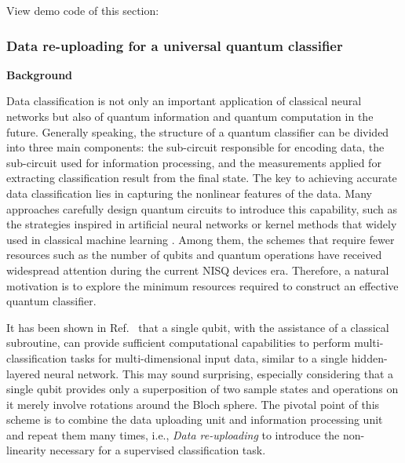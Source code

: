 View demo code of this section: 

\subsubsection{Data re-uploading for a universal quantum classifier}
\textbf{Background}


Data classification is not only an important application of classical neural networks but also of quantum information and quantum computation in the future. Generally speaking, the structure of a quantum classifier can be divided into three main components: the sub-circuit responsible for encoding data, the sub-circuit used for information processing, and the measurements applied for extracting classification result from the final state.
The key to achieving accurate data classification lies in capturing the nonlinear features of the data. Many approaches carefully design quantum circuits to introduce this capability, such as the strategies inspired in artificial neural networks or kernel methods that widely used in classical machine learning \cite{PhysRevLett.122.040504, 2019Supervised_nature, Wan_2017_npjqi, hur2022quantum, chalumuri2021hybrid, oh2020tutorial, farhi2018classification, wrobel2021application}. Among them, the schemes that require fewer resources such as the number of qubits and quantum operations have received widespread attention during the current NISQ devices era.
Therefore, a natural motivation is to explore the minimum resources required to construct an effective quantum classifier.

It has been shown in Ref.~\cite{PerezSalinas2020datareuploading} that a single qubit, with the assistance of a classical subroutine, can provide sufficient computational capabilities to perform multi-classification tasks for multi-dimensional input data, similar to a single hidden-layered neural network. This may sound surprising, especially considering that a single qubit provides only a superposition of two sample states and operations on it merely involve rotations around the Bloch sphere.
The pivotal point of this scheme is to combine the data uploading unit and information processing unit and repeat them many times, i.e., \textit{Data re-uploading} to introduce the non-linearity necessary for a supervised classification task.

